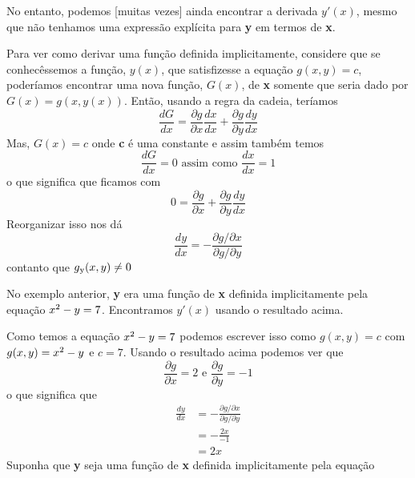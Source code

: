 \documentclass[a4paper]{article}
\begin{document}
No entanto, podemos [muitas vezes] ainda encontrar a derivada $y'(x)$, mesmo que não tenhamos uma expressão explícita para \textbf{y} em termos de \textbf{x}.
\par Para ver como derivar uma função definida implicitamente, considere que se conhecêssemos a função, $y(x)$, que satisfizesse a equação $g(x,y) = c$, poderíamos encontrar uma nova função, $G(x)$, de \textbf{x} somente que seria dado por $G(x) = g(x,y(x))$. Então, usando a regra da cadeia, teríamos
\begin{equation}
    \frac{dG}{dx} = \frac{\partial g}{\partial x} \frac{dx}{dx} + \frac{\partial g}{\partial y} \frac{dy}{dx}
\end{equation}
Mas, $G(x) = c$ onde \textbf{c} é uma constante e assim também temos
\begin{equation}
    \frac{dG}{dx} = 0 \textrm{ assim como } \frac{dx}{dx} = 1
\end{equation}
o que significa que ficamos com
\begin{equation}
     0 = \frac{\partial g}{\partial x} + \frac{\partial g}{\partial y} \frac{dy}{dx} 
\end{equation}
Reorganizar isso nos dá
\begin{equation}
    \frac{dy}{dx} = - \frac{\partial g/\partial x}{\partial g/\partial y}
\end{equation}
contanto que $g\textsubscript{y}(x,y) \neq 0$
\par No exemplo anterior, \textbf{y} era uma função de \textbf{x} definida implicitamente pela equação $x\textsuperscript{2} - y = 7$. Encontramos $y'(x)$ usando o resultado acima.
\par Como temos a equação $x\textsuperscript{2} - y = 7$ podemos escrever isso como $g(x,y) = c$ com $g(x,y) = x\textsuperscript{2} - y$ e $c = 7$. Usando o resultado acima podemos ver que
\begin{equation}
    \frac{\partial g}{\partial x} = 2 \textrm{ e }\frac{\partial g}{\partial y} = - 1
\end{equation}
o que significa que
\begin{equation}
    \begin{split}
        \frac{dy}{dx} & = - \frac{\partial g/\partial x}{\partial g/\partial y} \\
        & = - \frac{2x}{-1} \\
        & = 2x
    \end{split}
\end{equation}
Suponha que \textbf{y} seja uma função de \textbf{x} definida implicitamente pela equação
\end{document}
